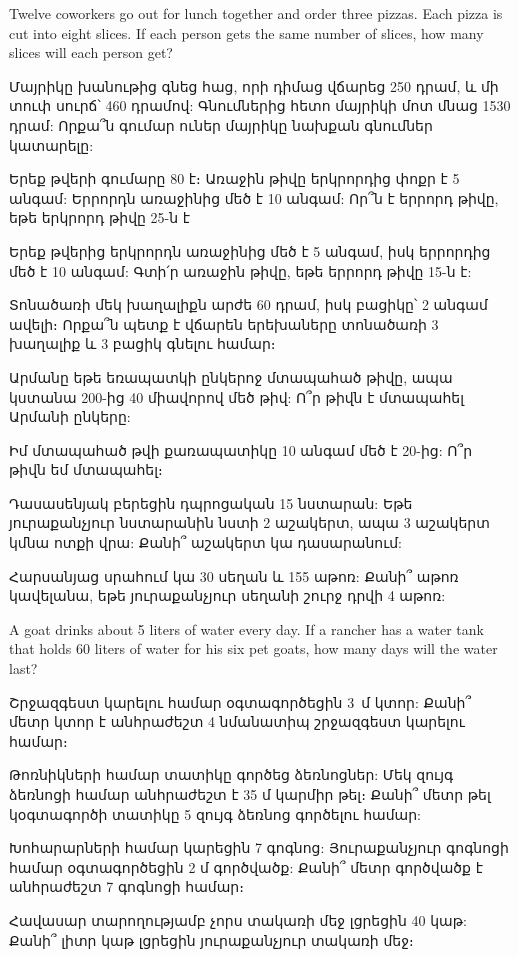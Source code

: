 \problem
Twelve coworkers go out for lunch together and order three 
pizzas. Each pizza is cut into eight slices. If each person 
gets the same number of slices, how many slices will each 
person get?

\problem
Մայրիկը խանութից գնեց հաց, որի դիմաց վճարեց 250 դրամ, 
և մի տուփ սուրճ՝ 460 դրամով: Գնումներից հետո մայրիկի 
մոտ մնաց 1530 դրամ: Որքա՞ն գումար ուներ մայրիկը նախքան 
գնումներ կատարելը:

\problem
Երեք թվերի գումարը 80 է։ Առաջին թիվը երկրորդից փոքր 
է 5 անգամ: Երրորդն առա\-ջինից մեծ է 10 անգամ: Որ՞ն է 
երրորդ թիվը, եթե երկրորդ թիվը 25-ն է

\problem
Երեք թվերից երկրորդն առաջինից մեծ է 5 անգամ, իսկ 
երրորդից մեծ է 10 անգամ: Գտի՛ր առաջին թիվը, եթե 
երրորդ թիվը 15-ն է:

\problem
Տոնածառի մեկ խաղալիքն արժե 60 դրամ, իսկ բացիկը՝ 2 
անգամ ավելի։ Որքա՞ն պետք է վճարեն երեխաները տոնածառի 
3 խաղալիք և 3 բացիկ գնելու համար։

\problem
Արմանը եթե եռապատկի ընկերոջ մտապահած թիվը, ապա կստանա 
200-ից 40 միավորով մեծ թիվ: Ո՞ր թիվն է մտապահել Արմանի 
ընկերը:

\problem
Իմ մտապահած թվի քառապատիկը 10 անգամ մեծ է 20-ից: Ո՞ր 
թիվն եմ մտապահել։

\problem
Դասասենյակ բերեցին դպրոցական 15 նստարան: Եթե յուրաքանչյուր 
նստարանին նստի 2 աշակերտ, ապա 3 աշակերտ կմնա ոտքի վրա: 
Քանի՞ աշակերտ կա դասարանում:

\problem
Հարսանյաց սրահում կա 30 սեղան և 155 աթոռ: Քանի՞ աթոռ 
կավելանա, եթե յուրաքանչյուր սեղանի շուրջ դրվի 4 աթոռ:

\problem
A goat drinks about 5 liters of water every day. If a 
rancher has a water tank that holds 60 liters of water 
for his six pet goats, how many days will the water last?

\problem
Շրջազգեստ կարելու համար օգտագործեցին 3~մ կտոր: Քանի՞ 
մետր կտոր է անհրաժեշտ 4 նմանատիպ շրջազգեստ կարելու համար։

\problem
Թոռնիկների համար տատիկը գործեց ձեռնոցներ: Մեկ զույգ 
ձեռնոցի համար անհրաժեշտ է 35 մ կարմիր թել։ Քանի՞ մետր 
թել կօգտագործի տատիկը 5 զույգ ձեռնոց գործելու համար:

\problem
Խոհարարների համար կարեցին 7 գոգնոց: Յուրաքանչյուր 
գոգնոցի համար օգտագործեցին 2 մ գործվածք: Քանի՞ մետր 
գործվածք է անհրաժեշտ 7 գոգնոցի համար։

\problem
Հավասար տարողությամբ չորս տակառի մեջ լցրեցին 40 կաթ: 
Քանի՞ լիտր կաթ լցրեցին յուրաքանչյուր տակառի մեջ։

